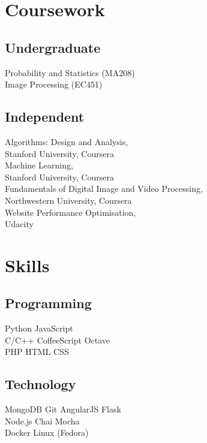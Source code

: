 \documentclass[]{deedy-resume-openfont}
\begin{document}
\begin{minipage}[t]{0.33\textwidth}
\section{Coursework}
\subsection{Undergraduate}
\textbullet{} Probability and Statistics (MA208)\\
\textbullet{} Image Processing (EC451)
\sectionsep
\subsection{Independent}
\textbullet{} Algorithms: Design and Analysis,\\ Stanford University, Coursera\\
\textbullet{} Machine Learning, \\Stanford University, Coursera\\
\textbullet{} Fundamentals of Digital Image and Video Processing,\\ Northwestern University, Coursera \\
\textbullet{} Website Performance Optimisation,\\ Udacity
\sectionsep


\section{Skills}
\subsection{Programming}
\textbullet{} Python \textbullet{} JavaScript \\
\textbullet{} C/C++ \textbullet{} CoffeeScript \textbullet{} Octave \\
\textbullet{} PHP \textbullet{} HTML \textbullet{}  CSS \\
\subsection{Technology}
\textbullet{} MongoDB \textbullet{} Git \textbullet{} AngularJS \textbullet{} Flask \\
\textbullet{} Node.js \textbullet{} Chai \textbullet{} Mocha \\
\textbullet{} Docker \textbullet{} Linux (Fedora)
\sectionsep


\end{minipage}
\end{document}
